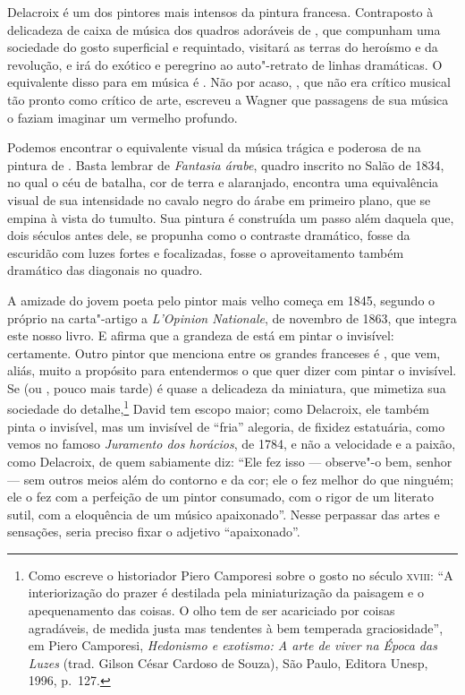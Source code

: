 Delacroix é um dos pintores mais intensos da pintura francesa.
Contraposto à delicadeza de caixa de música dos quadros adoráveis de
, que compunham uma sociedade do gosto superficial e requintado,
 visitará as terras do heroísmo e da revolução, e irá do
exótico e peregrino ao auto"-retrato de linhas dramáticas. O equivalente
disso para  em música é . Não por acaso, ,
que não era crítico musical tão pronto como crítico de arte, escreveu a
Wagner que passagens de sua música o faziam imaginar um vermelho
profundo. 

Podemos encontrar o equivalente visual da música trágica e poderosa de
 na pintura de . Basta lembrar de \textit{Fantasia
árabe}, quadro inscrito no Salão de 1834, no qual o céu de batalha, cor
de terra e alaranjado, encontra uma equivalência visual de sua
intensidade no cavalo negro do árabe em primeiro plano, que se empina à
vista do tumulto. Sua pintura é construída um passo além daquela que,
dois séculos antes dele, se propunha como o contraste dramático, fosse
da escuridão com luzes fortes e focalizadas, fosse o aproveitamento
também dramático das diagonais no quadro.

A amizade do jovem poeta pelo pintor mais velho começa em 1845, segundo
o próprio  na carta"-artigo a \textit{L’Opinion Nationale}, de
novembro de 1863, que integra este nosso livro. E  afirma que
a grandeza de  está em pintar o invisível: certamente. Outro
pintor que menciona entre os grandes franceses é ,
que vem, aliás, muito a propósito para entendermos o que 
quer dizer com pintar o invisível. Se  (ou , pouco mais
tarde) é quase a delicadeza da miniatura, que mimetiza sua sociedade do
detalhe,\footnote{ Como escreve o historiador Piero Camporesi sobre o 
gosto no século \textsc{xviii}: “A interiorização do prazer é destilada pela
miniaturização da paisagem e o apequenamento das coisas. O olho tem de
ser acariciado por coisas agradáveis, de medida justa mas tendentes à
bem temperada graciosidade”, em Piero Camporesi,
\textit{Hedonismo e exotismo: A arte de viver na Época das Luzes
}(trad. Gilson César Cardoso de Souza), São Paulo, Editora Unesp,
1996, p.~127.} David tem escopo maior; como Delacroix, ele também
pinta o invisível, mas um invisível de “fria” alegoria, de fixidez
estatuária, como vemos no famoso \textit{Juramento dos horácios}, de
1784, e não a velocidade e a paixão, como Delacroix, de quem 
sabiamente diz: “Ele fez isso --- observe"-o bem, senhor --- sem outros
meios além do contorno e da cor; ele o fez melhor do que ninguém; ele o
fez com a perfeição de um pintor consumado, com o rigor de um literato
sutil, com a eloquência de um músico apaixonado”. Nesse perpassar das
artes e sensações, seria preciso fixar o adjetivo “apaixonado”.

